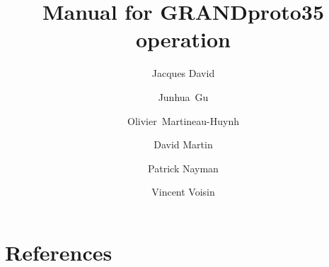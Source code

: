 \documentclass[article,12pt]{elsarticle}
\begin{document}
 
\begin{frontmatter} 
\title{Manual for GRANDproto35 operation} 
\author[lpnhe]{Jacques David} 
\author[naoc]{Junhua~Gu}
\author[lpnhe]{Olivier~Martineau-Huynh} 
\author[lpnhe]{David Martin} 
\author[lpnhe]{Patrick Nayman}
\author[lpnhe]{Vincent Voisin}

\address[lpnhe]{LPNHE, Universit\'e Pierre et Marie Curie, Universit\'e Paris Diderot, CNRS/IN2P3, Paris, France.} 
\address[naoc]{National Astronomical Observatories of China, Chinese Academy of Science, Beijing 100012, P.R. China.} 
\end{frontmatter} 








\section{References}
 
 
\end{document}
